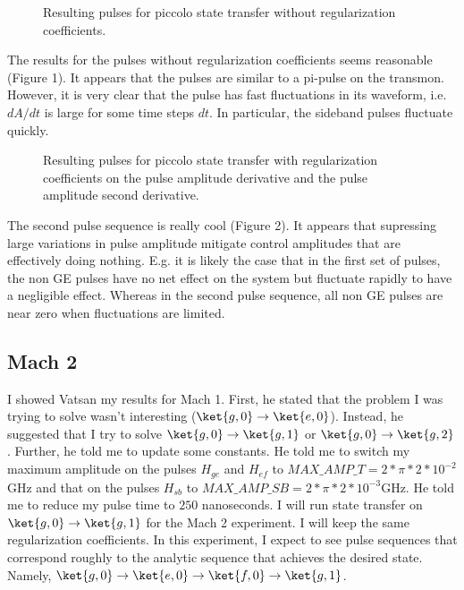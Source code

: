\documentclass[letterpaper, 12pt]{article}
\begin{document}
\begin{figure}
  \caption{Resulting pulses for piccolo state transfer without regularization coefficients.}
\end{figure}

The results for the pulses without regularization coefficients seems reasonable (Figure 1). It appears that the pulses are similar to a pi-pulse on the transmon. However, it is very clear that the pulse has fast fluctuations in its waveform, i.e. $dA/dt$ is large for some time steps $dt$. In particular, the sideband pulses fluctuate quickly.

\begin{figure}
  \caption{Resulting pulses for piccolo state transfer with regularization coefficients on
    the pulse amplitude derivative and the pulse amplitude second derivative.}
\end{figure}

The second pulse sequence is really cool (Figure 2). It appears that supressing large variations in pulse amplitude mitigate control amplitudes that are effectively doing nothing. E.g. it is likely the case that in the first set of pulses, the non GE pulses have no net effect on the system but fluctuate rapidly to have a negligible effect. Whereas in the second pulse sequence, all non GE pulses are near zero when fluctuations are limited.

\subsection{Mach 2}
I showed Vatsan my results for Mach 1. First, he stated that the problem I was trying to solve wasn't interesting ($\ket{g, 0} \rightarrow \ket{e, 0}$). Instead, he suggested that I try to solve $\ket{g, 0} \rightarrow \ket{g, 1}$ or $\ket{g, 0} \rightarrow \ket{g, 2}$. Further, he told me to update some constants. He told me to switch my maximum amplitude on the pulses $H_{ge}$ and $H_{ef}$ to $MAX\_AMP\_T = 2 * \pi * 2 * 10^{-2}$GHz and that on the pulses $H_{sb}$ to $MAX\_AMP\_SB = 2 * \pi * 2 * 10^{-3}$GHz. He told me to reduce my pulse time to $250$ nanoseconds. I will run state transfer on $\ket{g,0} \rightarrow \ket{g, 1}$ for the Mach 2 experiment. I will keep the same regularization coefficients. In this experiment, I expect to see pulse sequences that correspond roughly to the analytic sequence that achieves the desired state. Namely, $\ket{g, 0} \rightarrow \ket{e, 0} \rightarrow \ket{f, 0} \rightarrow \ket{g, 1}$.
\end{document}
